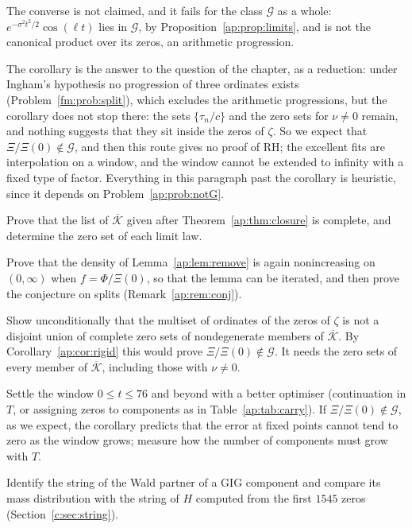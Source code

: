 The converse is not claimed, and it fails for the class $\mathcal G$ as a whole: $e^{-\sigma^2t^2/2}\cos(\ell t)$ lies in $\mathcal G$, by Proposition~\ref{ap:prop:limits}, and is not the canonical product over its zeros, an arithmetic progression.

The corollary is the answer to the question of the chapter, as a reduction: under Ingham's hypothesis no progression of three ordinates exists (Problem~\ref{fm:prob:split}), which excludes the arithmetic progressions, but the corollary does not stop there: the sets $\{\tau_n/c\}$ and the zero sets for $\nu\ne0$ remain, and nothing suggests that they sit inside the zeros of $\zeta$. So we expect that $\Xi/\Xi(0)\notin\mathcal G$, and then this route gives no proof of RH; the excellent fits are interpolation on a window, and the window cannot be extended to infinity with a fixed type of factor. Everything in this paragraph past the corollary is heuristic, since it depends on Problem~\ref{ap:prob:notG}.

\begin{problem}\label{ap:prob:list}
Prove that the list of $\overline{\mathcal K}$ given after Theorem~\ref{ap:thm:closure} is complete, and determine the zero set of each limit law.
\end{problem}
\begin{problem}\label{ap:prob:iterate}
Prove that the density of Lemma~\ref{ap:lem:remove} is again nonincreasing on $(0,\infty)$ when $f=\Phi/\Xi(0)$, so that the lemma can be iterated, and then prove the conjecture on splits (Remark~\ref{ap:rem:conj}).
\end{problem}
\begin{problem}\label{ap:prob:notG}
Show unconditionally that the multiset of ordinates of the zeros of $\zeta$ is not a disjoint union of complete zero sets of nondegenerate members of $\overline{\mathcal K}$. By Corollary~\ref{ap:cor:rigid} this would prove $\Xi/\Xi(0)\notin\mathcal G$. It needs the zero sets of every member of $\overline{\mathcal K}$, including those with $\nu\ne0$.
\end{problem}
\begin{problem}\label{ap:prob:window}
Settle the window $0\le t\le76$ and beyond with a better optimiser (continuation in $T$, or assigning zeros to components as in Table~\ref{ap:tab:carry}). If $\Xi/\Xi(0)\notin\mathcal G$, as we expect, the corollary predicts that the error at fixed points cannot tend to zero as the window grows; measure how the number of components must grow with $T$.
\end{problem}
\begin{problem}\label{ap:prob:string}
Identify the string of the Wald partner of a GIG component and compare its mass distribution with the string of $H$ computed from the first $1545$ zeros (Section~\ref{c:sec:string}).
\end{problem}

